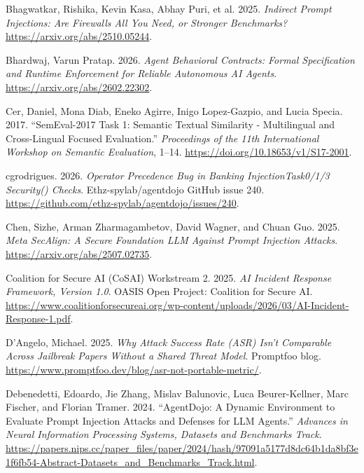 \documentclass[
  american,
  10pt,
  a4paper,
]{article}
\newlength{\cslhangindent}
\newenvironment{CSLReferences}[2] %
 {\begin{list}{}{%
  \setlength{\itemindent}{0pt}
  \setlength{\leftmargin}{0pt}
  \setlength{\parsep}{0pt}
  \ifodd #1
   \setlength{\leftmargin}{\cslhangindent}
   \setlength{\itemindent}{-1\cslhangindent}
  \fi
  \setlength{\itemsep}{#2\baselineskip}}}
 {\end{list}}
\begin{document}
\begin{CSLReferences}{1}{1}
Bhagwatkar, Rishika, Kevin Kasa, Abhay Puri, et al. 2025. \emph{Indirect
Prompt Injections: Are Firewalls All You Need, or Stronger Benchmarks?}
\url{https://arxiv.org/abs/2510.05244}.

Bhardwaj, Varun Pratap. 2026. \emph{Agent Behavioral Contracts: Formal
Specification and Runtime Enforcement for Reliable Autonomous {AI}
Agents}. \url{https://arxiv.org/abs/2602.22302}.

Cer, Daniel, Mona Diab, Eneko Agirre, Inigo Lopez-Gazpio, and Lucia
Specia. 2017. {``SemEval-2017 Task 1: Semantic Textual Similarity -
Multilingual and Cross-Lingual Focused Evaluation.''} \emph{Proceedings
of the 11th International Workshop on Semantic Evaluation}, 1--14.
\url{https://doi.org/10.18653/v1/S17-2001}.

{cgrodrigues}. 2026. \emph{Operator Precedence Bug in Banking
{InjectionTask0/1/3} Security() Checks}. Ethz-spylab/agentdojo GitHub
issue 240. \url{https://github.com/ethz-spylab/agentdojo/issues/240}.

Chen, Sizhe, Arman Zharmagambetov, David Wagner, and Chuan Guo. 2025.
\emph{Meta SecAlign: A Secure Foundation LLM Against Prompt Injection
Attacks}. \url{https://arxiv.org/abs/2507.02735}.

Coalition for Secure AI (CoSAI) Workstream 2. 2025. \emph{{AI} Incident
Response Framework, Version 1.0}. OASIS Open Project: Coalition for
Secure AI.
\url{https://www.coalitionforsecureai.org/wp-content/uploads/2026/03/AI-Incident-Response-1.pdf}.

D'Angelo, Michael. 2025. \emph{Why Attack Success Rate ({ASR}) Isn't
Comparable Across Jailbreak Papers Without a Shared Threat Model}.
Promptfoo blog.
\url{https://www.promptfoo.dev/blog/asr-not-portable-metric/}.

Debenedetti, Edoardo, Jie Zhang, Mislav Balunovic, Luca Beurer-Kellner,
Marc Fischer, and Florian Tramer. 2024. {``AgentDojo: A Dynamic
Environment to Evaluate Prompt Injection Attacks and Defenses for LLM
Agents.''} \emph{Advances in Neural Information Processing Systems,
Datasets and Benchmarks Track}.
\url{https://papers.nips.cc/paper_files/paper/2024/hash/97091a5177d8dc64b1da8bf3e1f6fb54-Abstract-Datasets_and_Benchmarks_Track.html}.


\end{CSLReferences}
\end{document}
